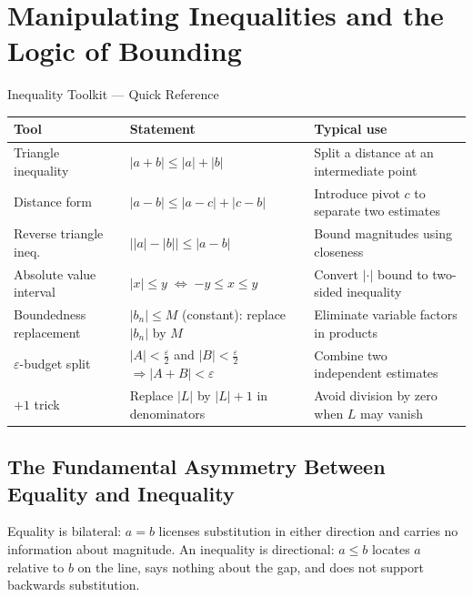 
\section{Manipulating Inequalities and the Logic of Bounding}
\label{sec:inequality-bounding}

\begin{toolkitbox}{Inequality Toolkit --- Quick Reference}
\small
\begin{tabular}{l l l}
\toprule
\textbf{Tool} & \textbf{Statement} & \textbf{Typical use} \\
\midrule
Triangle inequality
  & $|a+b|\leq|a|+|b|$
  & Split a distance at an intermediate point \\[3pt]
Distance form
  & $|a-b|\leq|a-c|+|c-b|$
  & Introduce pivot $c$ to separate two estimates \\[3pt]
Reverse triangle ineq.
  & $\bigl\lvert|a|-|b|\bigr\rvert\leq|a-b|$
  & Bound magnitudes using closeness \\[3pt]
Absolute value interval
  & $|x|\leq y\;\Longleftrightarrow\;{-y}\leq x\leq y$
  & Convert $|\cdot|$ bound to two-sided inequality \\[3pt]
Boundedness replacement
  & $|b_n|\leq M$ (constant): replace $|b_n|$ by $M$
  & Eliminate variable factors in products \\[3pt]
$\varepsilon$-budget split
  & $|A|<\tfrac{\varepsilon}{2}$ and $|B|<\tfrac{\varepsilon}{2}$
    $\Rightarrow|A+B|<\varepsilon$
  & Combine two independent estimates \\[3pt]
$+1$ trick
  & Replace $|L|$ by $|L|+1$ in denominators
  & Avoid division by zero when $L$ may vanish \\
\bottomrule
\end{tabular}
\end{toolkitbox}

\subsection*{The Fundamental Asymmetry Between Equality and Inequality}
\label{subsec:ineq-asymmetry}

Equality is bilateral: $a=b$ licenses substitution in either direction and
carries no information about magnitude. An inequality is directional:
$a\leq b$ locates $a$ relative to $b$ on the line, says nothing about the
gap, and does not support backwards substitution.

